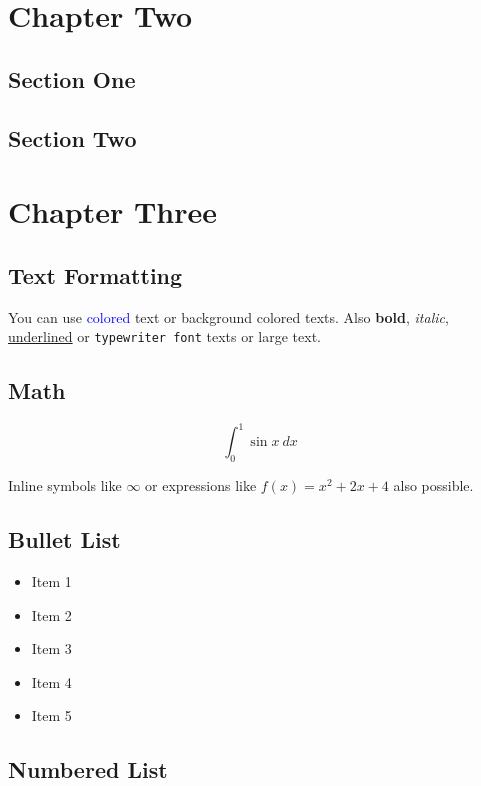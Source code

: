 \documentclass[12pt, twoside]{book}
\begin{document}
\chapter{Chapter Two}

\section{Section One}
\blindtext[3]

\section{Section Two}
\blindtext

\chapter{Chapter Three}

\section{Text Formatting}
You can use \textcolor{blue}{colored} text or
\colorbox{BurntOrange}{background colored} texts. Also
\textbf{bold}, \textit{italic}, \underline{underlined} or
\texttt{typewriter font} texts or \large{large} text.

\section{Math}
$$\int_0^1{\sin x} \ dx$$

Inline symbols like $\infty$ or expressions like 
$f(x) = x^2 + 2x + 4$ also possible.

\section{Bullet List}

\begin{itemize}
    \item Item 1
    \item Item 2
    \item Item 3
    \item Item 4
    \item Item 5
\end{itemize}

\section{Numbered List}
\end{document}

